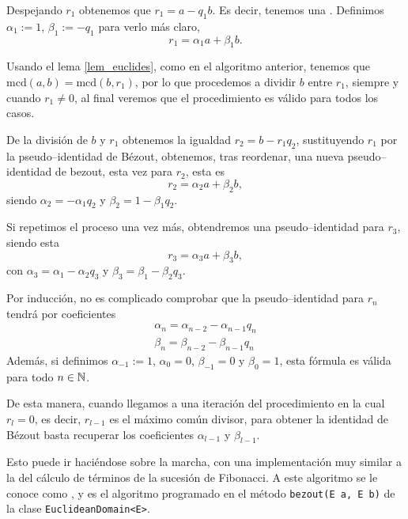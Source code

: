 \documentclass[a4paper, 11pt, twoside, notitlepage, openany, onecolumn, final]{report}
\begin{document}
	Despejando $r_1$ obtenemos que $r_1=a-q_1b$. Es decir, tenemos una . Definimos $\alpha_1:=1$, $\beta_1:=-q_1$ para verlo más claro, \begin{equation*}
		r_1 = \alpha_1a +\beta_1b.
	\end{equation*}
	
	Usando el lema \eqref{lem_euclides}, como en el algoritmo anterior, tenemos que $\text{mcd}(a,b)=\text{mcd}(b,r_1)$, por lo que procedemos a dividir $b$ entre $r_1$, siempre y cuando $r_1\not=0$, al final veremos que el procedimiento es válido para todos los casos.
	
	De la división de  $b$ y $r_1$ obtenemos la igualdad $r_2=b-r_1q_2$, sustituyendo $r_1$ por la pseudo--identidad de Bézout, obtenemos, tras reordenar, una nueva pseudo--identidad de bezout, esta vez para $r_2$, esta es
	\begin{equation*}
		r_2=\alpha_2a+\beta_2b,
	\end{equation*}
	siendo $\alpha_2=-\alpha_1q_2$ y $\beta_2=1-\beta_1q_2$.
	
	Si repetimos el proceso una vez más, obtendremos una pseudo--identidad para $r_3$, siendo esta
	\begin{equation*}
		r_3=\alpha_3a+\beta_3b,
	\end{equation*}
	con $\alpha_3=\alpha_1-\alpha_2q_3$ y $\beta_3=\beta_1-\beta_2q_3$.
	
	Por inducción, no es complicado comprobar que la pseudo--identidad para $r_n$ tendrá por coeficientes
	\begin{equation*}
		\begin{array}{c}
			\alpha_n=\alpha_{n-2}-\alpha_{n-1}q_n\\
			\beta_n=\beta_{n-2}-\beta_{n-1}q_n
		\end{array}
	\end{equation*}
	Además, si definimos $\alpha_{-1}:=1$, $\alpha_{0}=0$, $\beta_{-1}=0$ y $\beta_{0}=1$, esta fórmula es válida para todo $n\in\mathbb{N}$.
	
	De esta manera, cuando llegamos a una iteración del procedimiento en la cual $r_l=0$, es decir, $r_{l-1}$ es el máximo común divisor, para obtener la identidad de Bézout basta recuperar los coeficientes $\alpha_{l-1}$ y $\beta_{l-1}$.
	
	Esto puede ir haciéndose sobre la marcha, con una implementación muy similar a la del cálculo de términos de la sucesión de Fibonacci. A este algoritmo se le conoce como , y es el algoritmo programado en el método \texttt{bezout(E a, E b)} de la clase \texttt{EuclideanDomain<E>}.
	
\end{document}
